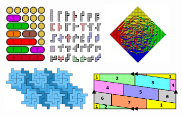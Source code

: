 \documentclass{deliverablereport}
\begin{document}
\begin{figure}%
  \begin{center}
    \includegraphics[width=0.20\textwidth]{images/partitions-of-5}
    \hfil\hfil
    \includegraphics[width=0.25\textwidth]{images/hexominoes}
    \hfil
    \includegraphics[width=0.30\textwidth]{images/AztecDiamond}
    \includegraphics[width=0.4\textwidth]{images/nonominoes}
    \hfil
    \includegraphics[width=0.4\textwidth]{images/500px-Torus_with_seven_colours}

\end{center}
\end{figure}
\end{document}
